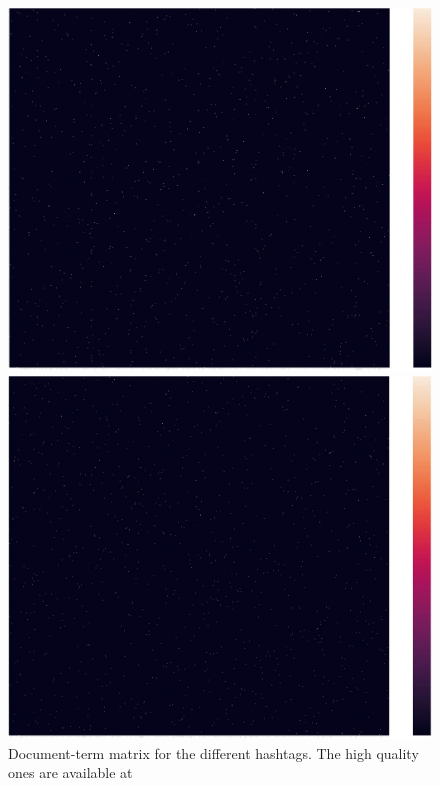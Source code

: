 \documentclass[12pt,%
               a4paper,%
               oneside,openany,%
               titlepage,%
               headinclude,footinclude,%
               BCOR5mm,%
               cleardoublepage=empty,%
               tablecaptionabove,%
               floatperchapter,
               ]{scrreprt}                 %
\begin{document}
\begin{figure}[ht]
\begin{minipage}[b]{0.5\linewidth}
    \includegraphics[width=.9\linewidth]{Figures/Matrix_vaccine.jpg}
    \vspace{4ex}
  \end{minipage}
  \begin{minipage}[b]{0.5\linewidth}
    \centering
    \includegraphics[width=.9\linewidth]{Figures/Matrix_freedom.jpg}
    \vspace{4ex}
  \end{minipage}

\caption{Document-term matrix for the different hashtags. The high quality ones are available at \cite{Folder}}
\label{Matrix_ALL}
\end{figure}
\end{document}
